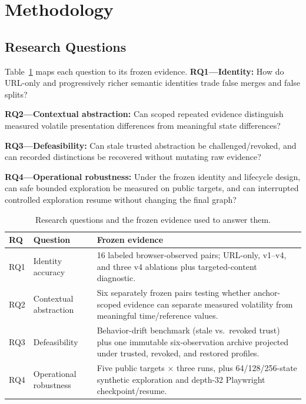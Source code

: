 \documentclass[conference]{IEEEtran}
\begin{document}
\section{Methodology}
\subsection{Research Questions}
Table~\ref{tab:rqmap} maps each question to its frozen evidence. \textbf{RQ1---Identity:} How do URL-only and progressively richer semantic identities trade false merges and false splits?

\textbf{RQ2---Contextual abstraction:} Can scoped repeated evidence distinguish measured volatile presentation differences from meaningful state differences?

\textbf{RQ3---Defeasibility:} Can stale trusted abstraction be challenged/revoked, and can recorded distinctions be recovered without mutating raw evidence?

\textbf{RQ4---Operational robustness:} Under the frozen identity and lifecycle design, can safe bounded exploration be measured on public targets, and can interrupted controlled exploration resume without changing the final graph?



\begin{table}[t]
\caption{Research questions and the frozen evidence used to answer them.}
\label{tab:rqmap}
\centering
\small
\begin{tabular}{p{}p{}p{}}
\toprule
RQ & Question & Frozen evidence \\
\midrule
RQ1 & Identity accuracy & 16 labeled browser-observed pairs; URL-only, v1--v4, and three v4 ablations plus targeted-content diagnostic. \\
RQ2 & Contextual abstraction & Six separately frozen pairs testing whether anchor-scoped evidence can separate measured volatility from meaningful time/reference values. \\
RQ3 & Defeasibility & Behavior-drift benchmark (stale vs.\ revoked trust) plus one immutable six-observation archive projected under trusted, revoked, and restored profiles. \\
RQ4 & Operational robustness & Five public targets $\times$ three runs, plus 64/128/256-state synthetic exploration and depth-32 Playwright checkpoint/resume. \\
\bottomrule
\end{tabular}
\end{table}
\end{document}
